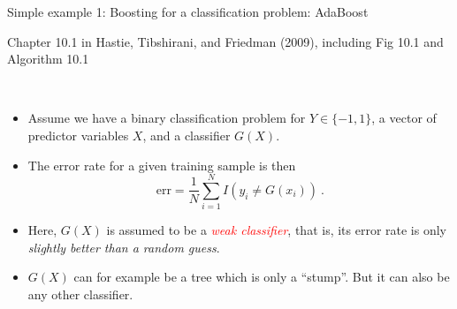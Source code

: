 \documentclass[
  10pt,
  ignorenonframetext,
]{beamer}
\providecommand{\tightlist}{%
  \setlength{\itemsep}{0pt}\setlength{\parskip}{0pt}}
\begin{document}
\begin{frame}
\begin{block}{Simple example 1: Boosting for a classification problem:
AdaBoost}
\label{simple-example-1-boosting-for-a-classification-problem-adaboost}
\tiny

Chapter 10.1 in Hastie, Tibshirani, and Friedman (2009), including Fig
10.1 and Algorithm 10.1

\normalsize

\(~\)

\begin{itemize}
\tightlist
\item
  Assume we have a binary classification problem for \(Y\in \{-1,1\}\),
  a vector of predictor variables \(X\), and a classifier \(G(X)\).
\end{itemize}

\vspace{2mm}

\begin{itemize}
\tightlist
\item
  The error rate for a given training sample is then
  \[\text{err} =\frac{1}{N} \sum_{i=1}^N I(y_i \neq G(x_i)) \ .\]
\end{itemize}

\vspace{2mm}

\begin{itemize}
\tightlist
\item
  Here, \(G(X)\) is assumed to be a
  \emph{\textcolor{red}{weak classifier}}, that is, its error rate is
  only \emph{slightly better than a random guess}.
\end{itemize}

\vspace{2mm}

\begin{itemize}
\tightlist
\item
  \(G(X)\) can for example be a tree which is only a ``stump''. But it
  can also be any other classifier.
\end{itemize}
\end{block}
\end{frame}
\end{document}

